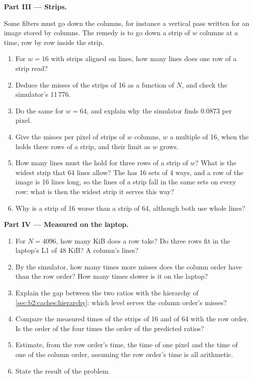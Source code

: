 \begin{problem}
\medskip\noindent\textbf{Part III --- Strips.}\par\nopagebreak
Some filters must go down the columns, for instance a vertical pass written for an image stored by columns. The
remedy is to go down a strip of $w$ columns at a time, row by row inside the strip.
\begin{enumerate}[resume, beginpenalty=10000]
\item For $w = 16$ with strips aligned on lines, how many lines does one row of a strip read?
\item Deduce the misses of the strips of 16 as a function of $N$, and check the simulator's 11\,776.
\item Do the same for $w = 64$, and explain why the simulator finds $0.0873$ per pixel.
\item Give the misses per pixel of strips of $w$ columns, $w$ a multiple of 16, when the  holds three rows of a
strip, and their limit as $w$ grows.
\item How many lines must the  hold for three rows of a strip of $w$? What is the widest strip that 64 lines
allow? The  has 16 sets of 4 ways, and a row of the image is 16 lines long, so the lines of a strip fall in the
same sets on every row: what is then the widest strip it serves this way?
\item Why is a strip of 16 worse than a strip of 64, although both use whole lines?
\end{enumerate}

\medskip\noindent\textbf{Part IV --- Measured on the laptop.}\par\nopagebreak
{}
\begin{enumerate}[resume, beginpenalty=10000]
\item For $N = 4096$, how many KiB does a row take? Do three rows fit in the laptop's L1 of 48 KiB? A column's lines?
\item By the simulator, how many times more misses does the column order have than the row order? How many times
slower is it on the laptop?
\item Explain the gap between the two ratios with the hierarchy of \cref{sec:b2:caches:hierarchy}: which level serves
the column order's misses?
\item Compare the measured times of the strips of 16 and of 64 with the row order. Is the order of the four times the
order of the predicted  ratios?
\item Estimate, from the row order's time, the time of one pixel and the time of one  of the column order,
assuming the row order's time is all arithmetic.
\item State the result of the problem.
\end{enumerate}
\end{problem}
